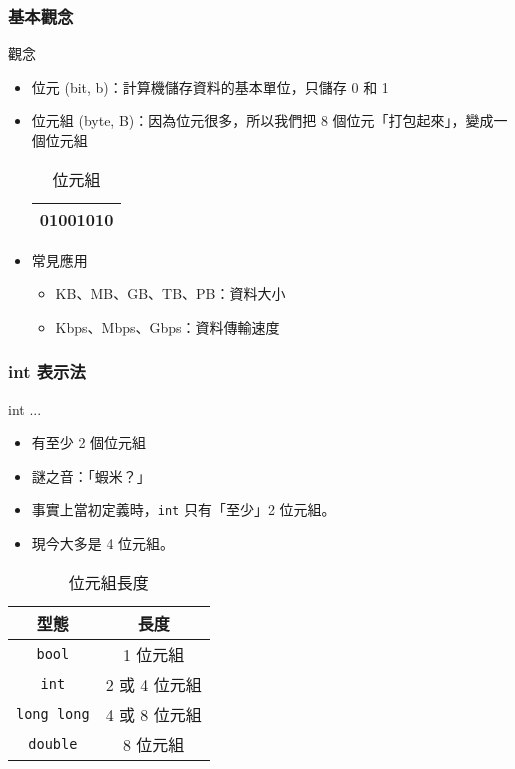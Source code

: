 \documentclass[utf8]{beamer}
\begin{document}
\begin{CJK}{UTF8}{bkai}
\begin{frame}[fragile]
  \frametitle{基本觀念}
  \begin{exampleblock}{觀念}
    \begin{itemize}[<+->]
    \item \alert{位元} (bit, b)：計算機儲存資料的基本單位，只儲存 \alert{0 和 1}
    \item \alert{位元組} (byte, B)：因為位元很多，所以我們把 8 個位元「打包起來」，變成一個位元組
      \begin{table}[h]
        \begin{tabular}{|c|}
        \hline
        01001010\\
        \hline
        \end{tabular}
        \caption{位元組}
      \end{table}
    \item 常見應用
      \begin{itemize}[<+->]
      \item KB、MB、GB、TB、PB：資料大小
      \item Kbps、Mbps、Gbps：資料傳輸速度
      \end{itemize}
    \end{itemize}
  \end{exampleblock}
\end{frame}

\begin{frame}[fragile]
  \frametitle{int 表示法}
  \begin{block}{int ...}
    \begin{itemize}
    \item 有至少 2 個位元組
    \item<2-> 謎之音：「蝦米？」
    \item<4-> 事實上當初定義時，\lstinline{int}{} 只有「至少」2 位元組。
    \item<5-> 現今大多是 4 位元組。
    \end{itemize}
  \end{block}
  \pause \pause \pause \pause \pause
  \begin{table}[h]
    \begin{tabular}{|c|c|}
      \hline
      型態                     & 長度\\
      \hline
      \lstinline{bool}{}      & 1 位元組\\
      \hline
      \lstinline{int}{}       & 2 或 \alert{4} 位元組\\
      \hline
      \lstinline{long long}{} & 4 或 \alert{8} 位元組\\
      \hline
      \lstinline{double}{}    & 8 位元組\\
      \hline
    \end{tabular}
    \caption{位元組長度}
  \end{table}
\end{frame}


\end{CJK}
\end{document}
